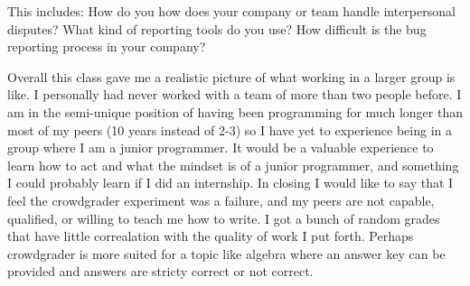 \documentclass{article}
\begin{document}
This includes: 
How do you how does your company or team handle interpersonal disputes? What kind of reporting tools do you use? How difficult is the bug reporting process in your company?
\par
Overall this class gave me a realistic picture of what working in a larger group is like.
I personally had never worked with a team of more than two people before.
I am in the semi-unique position of having been programming for much longer than most of my peers (10 years instead of 2-3) so I have yet to experience being in a group where I am a junior programmer.
It would be a valuable experience to learn how to act and what the mindset is of a junior programmer, and something I could probably learn if I did an internship.
In closing I would like to say that I feel the crowdgrader experiment was a failure, and my peers are not capable, qualified, or willing to teach me how to write. 
I got a bunch of random grades that have little correalation with the quality of work I put forth.
Perhaps crowdgrader is more suited for a topic like algebra where an answer key can be provided and answers are stricty correct or not correct.
\end{document}
